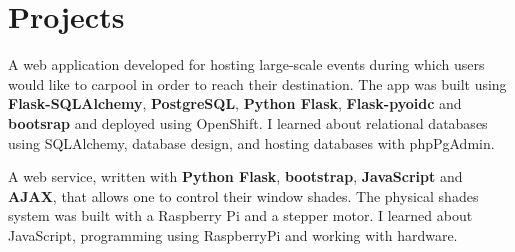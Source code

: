 \documentclass[]{deedy-resume-openfont}
\begin{document}
\begin{minipage}[t]{0.67\textwidth}


\section{Projects}
A web application developed for hosting large-scale events during which users would like to carpool in order to reach their destination.
The app was built using \textbf{Flask-SQLAlchemy}, \textbf{PostgreSQL}, \textbf{Python Flask}, \textbf{Flask-pyoidc} and \textbf{bootsrap} and deployed using OpenShift.
I learned about relational databases using SQLAlchemy, database design, and hosting databases with phpPgAdmin.
\sectionsep


A web service, written with \textbf{Python Flask}, \textbf{bootstrap}, \textbf{JavaScript} and \textbf{AJAX}, that allows one to control their window shades. The physical shades system was built with a Raspberry Pi and a stepper motor. I learned about JavaScript, programming using RaspberryPi and working with hardware.
\sectionsep



\end{minipage}
\end{document}
